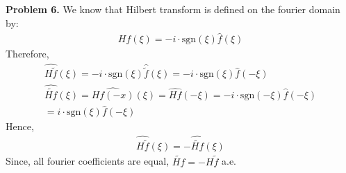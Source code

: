 \documentclass{article}
\newcommand{\sgn}{\text{sgn}}
\begin{document}
\textbf{Problem 6. } We know that Hilbert transform is defined on the fourier domain by:
\begin{gather*}
    \widehat{Hf}(\xi) = - i \cdot \sgn (\xi) \hat{f}(\xi)
\end{gather*}
Therefore,
\begin{gather*}
    \widehat{H\tilde{f}}(\xi) = -i\cdot \sgn (\xi) \hat{\tilde{f}}(\xi) = -i\cdot \sgn (\xi) \hat{f}(-\xi)\\
    \widehat{\widetilde{Hf}}(\xi) = \widehat{Hf(-x)} (\xi) = \widehat{Hf} (-\xi) = -i \cdot \sgn(-\xi) \hat{f} (-\xi)\\
    = i \cdot \sgn(\xi) \hat{f} (-\xi)
\end{gather*}
Hence,
\begin{gather*}
    \widehat{H\tilde{f}}(\xi) = - \widehat{\widetilde{Hf}}(\xi)
\end{gather*}
Since, all fourier coefficients are equal, $\widetilde{Hf} = - H\tilde{f}$ a.e.
\end{document}
